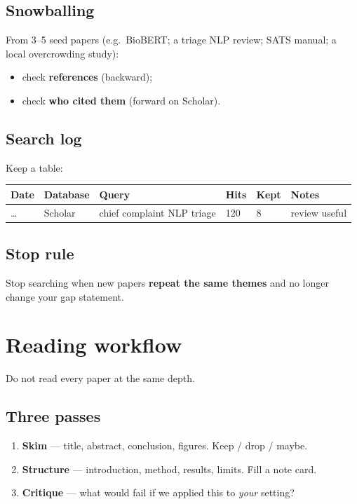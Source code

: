 \documentclass[11pt,a4paper]{article}
\begin{document}
\subsection{Snowballing}
From 3--5 seed papers (e.g.\ BioBERT; a triage NLP review; SATS manual; a local overcrowding study):
\begin{itemize}
  \item check \textbf{references} (backward);
  \item check \textbf{who cited them} (forward on Scholar).
\end{itemize}

\subsection{Search log}
Keep a table:
\begin{center}
\begin{tabular}{@{}llllll@{}}
\toprule
Date & Database & Query & Hits & Kept & Notes \\
\midrule
\ldots & Scholar & chief complaint NLP triage & 120 & 8 & review useful \\
\bottomrule
\end{tabular}
\end{center}

\subsection{Stop rule}
Stop searching when new papers \textbf{repeat the same themes} and no longer change your gap statement.

\section{Reading workflow}

Do not read every paper at the same depth.

\subsection{Three passes}
\begin{enumerate}
  \item \textbf{Skim} --- title, abstract, conclusion, figures. Keep / drop / maybe.
  \item \textbf{Structure} --- introduction, method, results, limits. Fill a note card.
  \item \textbf{Critique} --- what would fail if we applied this to \emph{your} setting?
\end{enumerate}
\end{document}
